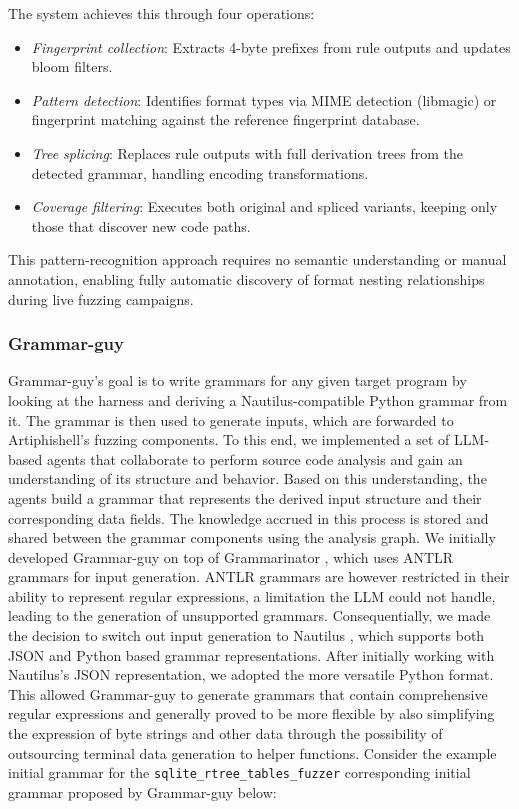 The system achieves this through four operations:

\begin{itemize}
\item \textit{Fingerprint collection}: Extracts 4-byte prefixes from rule outputs and updates bloom filters.

\item \textit{Pattern detection}: Identifies format types via MIME detection (libmagic) or fingerprint matching against the reference fingerprint database.

\item \textit{Tree splicing}: Replaces rule outputs with full derivation trees from the detected grammar, handling encoding transformations.

\item \textit{Coverage filtering}: Executes both original and spliced variants, keeping only those that discover new code paths.
\end{itemize}

This pattern-recognition approach requires no semantic understanding or manual annotation, enabling fully automatic discovery of format nesting relationships during live fuzzing campaigns.


\subsubsection{Grammar-guy}

Grammar-guy's goal is to write grammars for any given target program by looking at the harness and deriving a Nautilus-compatible Python grammar from it. The grammar is then used to generate inputs, which are forwarded to Artiphishell's fuzzing components.
To this end, we implemented a set of LLM-based agents that collaborate to perform source code analysis and gain an understanding of its structure and behavior. Based on this understanding, the agents build a grammar that represents the derived input structure and their corresponding data fields. The knowledge accrued in this process is stored and shared between the grammar components using the analysis graph.
We initially developed Grammar-guy on top of Grammarinator \cite{grammarinator}, which uses ANTLR grammars for input generation. ANTLR grammars are however restricted in their ability to represent regular expressions, a limitation the LLM could not handle, leading to the generation of unsupported grammars. Consequentially, we made the decision to switch out input generation to Nautilus \cite{nautilus}, which supports both JSON and Python based grammar representations. After initially working with Nautilus's JSON representation, we adopted the more versatile Python format. This allowed Grammar-guy to generate grammars that contain comprehensive regular expressions and generally proved to be more flexible by also simplifying the expression of byte strings and other data through the possibility of outsourcing terminal data generation to helper functions.
Consider the example initial grammar for the \verb|sqlite_rtree_tables_fuzzer| corresponding initial grammar proposed by Grammar-guy below:

